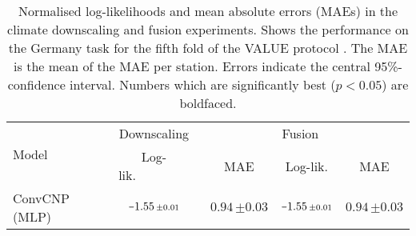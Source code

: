 \documentclass[12pt, twoside]{report}
\begin{document}
\begin{table}[t]
    \centering
    \caption[
        Results for the climate downscaling and fusion experiments
    ]{
        Normalised log-likelihoods and mean absolute errors (MAEs) in the climate downscaling and fusion experiments.
        Shows the performance on the Germany task for the fifth fold of the VALUE protocol \parencite{Maraun:2015:VALUE_A_Framework_to_Validate}.
        The MAE is the mean of the MAE per station.
        Errors indicate the central 95\%-confidence interval.
        Numbers which are significantly best ($p < 0.05$) are boldfaced.
    }
    \label{tab:climate_fusion_results}
    \small
    \begin{tabular}{lcccc}
        \toprule
        \multirow{2}{*}{Model} & Downscaling & & Fusion~~ &  \\
                               & Log-lik.~~~~~~~~$\,$ & MAE & Log-lik. & MAE  \\
        \midrule
        ConvCNP (MLP)
            & $\shortminus 1.55 \, {\scriptstyle \pm 0.01}$
            & $\mathbf{0.94} \, {\scriptstyle \pm 0.03}$
            & $\shortminus 1.55 \, {\scriptstyle \pm 0.01}$ 
            & $0.94 \, {\scriptstyle \pm 0.03}$ \\

\end{tabular}
\end{table}
\end{document}
